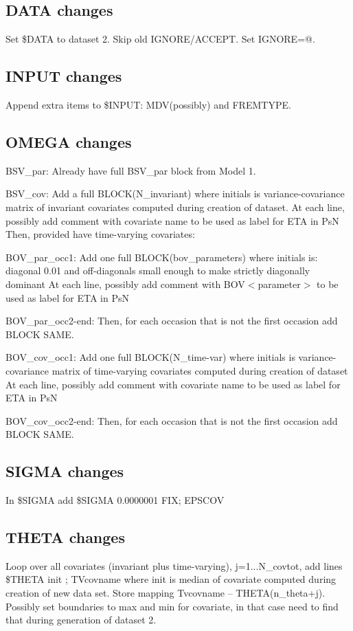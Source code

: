 \documentclass[a4paper,12pt]{article}
\begin{document}
\subsection{DATA changes}
Set \$DATA to dataset 2. Skip old IGNORE/ACCEPT. Set IGNORE=@.

\subsection{INPUT changes}
Append extra items to \$INPUT: MDV(possibly) and FREMTYPE.

\subsection{OMEGA changes}
BSV\_par: Already have full BSV\_par block from Model 1.

BSV\_cov: Add a full BLOCK(N\_invariant) where initials is variance-covariance matrix of invariant covariates computed during creation of dataset.
At each line, possibly add comment with covariate name to be used as label for ETA in PsN
Then, provided have time-varying covariates:

BOV\_par\_occ1: Add one full BLOCK(bov\_parameters) where initials is: diagonal 0.01 and off-diagonals small enough to make strictly diagonally dominant
At each line, possibly add comment with BOV$<$parameter$>$ to be used as label for ETA in PsN

BOV\_par\_occ2-end: Then, for each occasion that is not the first occasion add BLOCK SAME.

BOV\_cov\_occ1: Add one full BLOCK(N\_time-var) where initials is variance-covariance matrix of time-varying covariates computed during creation of dataset
At each line, possibly add comment with covariate name to be used as label for ETA in PsN

BOV\_cov\_occ2-end: Then, for each occasion that is not the first occasion add BLOCK SAME.

\subsection{SIGMA changes}
In \$SIGMA add 
\$SIGMA 0.0000001 FIX; EPSCOV

\subsection{THETA changes}
Loop over all covariates (invariant plus time-varying), j=1...N\_covtot, add lines
\$THETA init ; TVcovname
where init is median of covariate computed during creation of new data set. Store mapping Tvcovname – THETA(n\_theta+j). Possibly set boundaries to max and min for covariate, in that case need to find that during generation of dataset 2.
\end{document}
